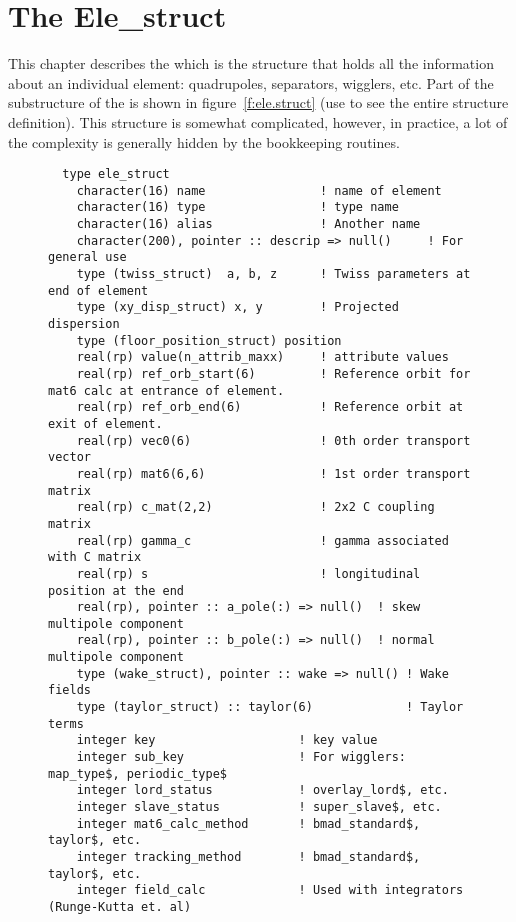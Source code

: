\chapter{The Ele_struct}
\label{c:ele.struct}

This chapter describes the  which is the structure that
holds all the information about an individual element: quadrupoles,
separators, wigglers, etc. 
Part of the substructure of the  is shown
in figure~\ref{f:ele.struct} (use  to see the entire structure 
definition). This structure is somewhat
complicated, however, in practice, a lot of the complexity is
generally hidden  by the \bmad bookkeeping routines.

\begin{figure}[htb]
\centering
\small
\begin{verbatim}
  type ele_struct
    character(16) name                ! name of element
    character(16) type                ! type name
    character(16) alias               ! Another name
    character(200), pointer :: descrip => null()     ! For general use
    type (twiss_struct)  a, b, z      ! Twiss parameters at end of element
    type (xy_disp_struct) x, y        ! Projected dispersion
    type (floor_position_struct) position
    real(rp) value(n_attrib_maxx)     ! attribute values
    real(rp) ref_orb_start(6)         ! Reference orbit for mat6 calc at entrance of element.
    real(rp) ref_orb_end(6)           ! Reference orbit at exit of element.
    real(rp) vec0(6)                  ! 0th order transport vector
    real(rp) mat6(6,6)                ! 1st order transport matrix
    real(rp) c_mat(2,2)               ! 2x2 C coupling matrix
    real(rp) gamma_c                  ! gamma associated with C matrix
    real(rp) s                        ! longitudinal position at the end
    real(rp), pointer :: a_pole(:) => null()  ! skew multipole component
    real(rp), pointer :: b_pole(:) => null()  ! normal multipole component
    type (wake_struct), pointer :: wake => null() ! Wake fields
    type (taylor_struct) :: taylor(6)             ! Taylor terms
    integer key                    ! key value
    integer sub_key                ! For wigglers: map_type$, periodic_type$
    integer lord_status            ! overlay_lord$, etc.
    integer slave_status           ! super_slave$, etc.
    integer mat6_calc_method       ! bmad_standard$, taylor$, etc.
    integer tracking_method        ! bmad_standard$, taylor$, etc.
    integer field_calc             ! Used with integrators (Runge-Kutta et. al)

\end{verbatim}
\end{figure}

